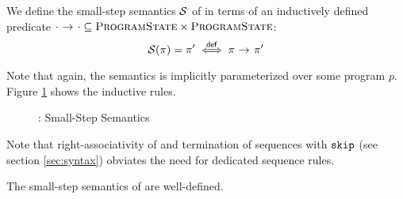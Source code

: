 
We define the small-step semantics $\mathcal{S}$ of \svlidf in terms of an inductively defined predicate ${\cdot} \,\,{\rightarrow^{}}\,\, {\cdot} \subseteq \textup{\textsc{ProgramState}} \times \textup{\textsc{ProgramState}}$:
\begin{displaymath}
\mathcal{S}(\pi) = \pi' \overset{\textup{\textsf{def}}}{\iff} {\pi} \,\,{\rightarrow^{}}\,\, {\pi'}
\end{displaymath}

Note that again, the semantics is implicitly parameterized over some program $p$.
Figure \ref{fig:svl-sem-dyn-sstep} shows the inductive rules.
\begin{figure}
    \boxed{\sstep{\pi}{\pi}}
    
    \caption{\svlidf: Small-Step Semantics}
    \label{fig:svl-sem-dyn-sstep}
\end{figure}
Note that right-associativity of \ttt{;} and termination of sequences with $\textup{\texttt{skip}}$ (see section \ref{sec:syntax}) obviates the need for dedicated sequence rules.

\begin{lemma}
    The small-step semantics of \svlidf are well-defined.
\end{lemma}